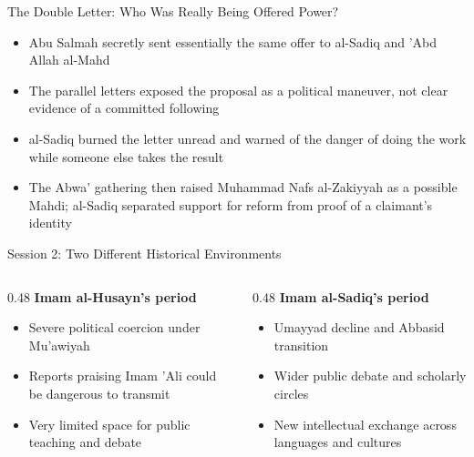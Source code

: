 \begin{frame}{The Double Letter: Who Was Really Being Offered Power?}
\begin{itemize}[itemsep=5pt]
  \item Abu Salmah secretly sent essentially the same offer to al-Sadiq and 'Abd Allah al-Mahd
  \item The parallel letters exposed the proposal as a political maneuver, not clear evidence of a committed following
  \item al-Sadiq burned the letter unread and warned of the danger of doing the work while someone else takes the result
  \item The Abwa' gathering then raised Muhammad Nafs al-Zakiyyah as a possible Mahdi; al-Sadiq separated support for reform from proof of a claimant's identity
\end{itemize}
\end{frame}


\begin{frame}{Session 2: Two Different Historical Environments}
\begin{columns}[T]
  \begin{column}{0.48\textwidth}
    \textbf{Imam al-Husayn's period}
    \begin{itemize}[itemsep=4pt]
      \item Severe political coercion under Mu'awiyah
      \item Reports praising Imam 'Ali could be dangerous to transmit
      \item Very limited space for public teaching and debate
    \end{itemize}
  \end{column}
  \begin{column}{0.48\textwidth}
    \textbf{Imam al-Sadiq's period}
    \begin{itemize}[itemsep=4pt]
      \item Umayyad decline and Abbasid transition
      \item Wider public debate and scholarly circles
      \item New intellectual exchange across languages and cultures
    \end{itemize}
  \end{column}
\end{columns}
\end{frame}

